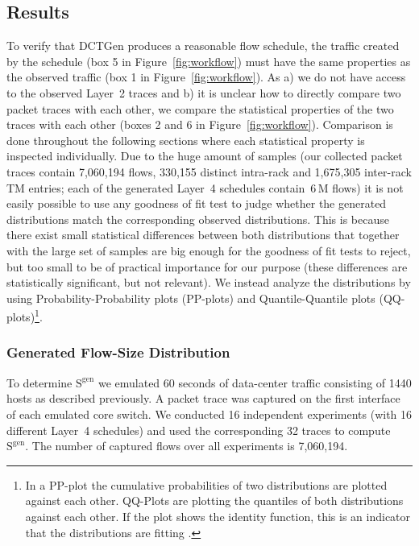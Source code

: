 \documentclass[journal,10pt]{IEEEtran}
\newcommand{\genname}{DCTGen}
\newcommand{\lt}{Layer~2}
\newcommand{\lf}{Layer~4}
\newcommand{\size}[1]{\ensuremath{\mathrm{S}  ^{\mathrm{#1}}}}
\begin{document}
	\subsection{Results}
		To verify that \genname{} produces a reasonable flow schedule, the traffic created by the schedule (box 5 in Figure~\ref{fig:workflow}) 
		must have the same properties as the observed traffic (box 1 in Figure~\ref{fig:workflow}).
		As a) we do not have access to the observed \lt{} traces and b) it is unclear how to directly compare two packet traces with each other,
		we compare the statistical properties of the two traces with each other (boxes 2 and 6 in Figure~\ref{fig:workflow}).
		Comparison is done throughout the following sections where each statistical property is inspected individually.
		Due to the huge amount of samples (our collected packet traces contain 7,060,194 flows, 330,155 distinct intra-rack and 1,675,305 inter-rack TM entries; 
		each of the generated \lf{} schedules contain \,6\,M flows)
		it is not easily possible to use any goodness of fit test to judge whether the generated distributions match
		the corresponding observed distributions.
		This is because there exist small statistical differences between both distributions that together with the large set of samples are big enough for the 
		goodness of fit tests to reject, but too small to be of practical importance for our purpose
		(these differences are statistically significant, but not relevant).
		We instead analyze the distributions by using 
		Probability-Probability plots (PP-plots) and Quantile-Quantile plots (QQ-plots)\footnote{In a PP-plot the cumulative probabilities of two distributions are plotted against each other. QQ-Plots are plotting the quantiles of both distributions against each other. If the plot shows the identity function,
		this is an indicator that the distributions are fitting \cite{GraphicalMethodsforDataAnalysis}.}.

		\subsubsection{Generated Flow-Size Distribution}
		\label{sec:GeneratedFlow-SizeDistribution}
			To determine \size{gen}
			we emulated 60 seconds of data-center traffic consisting of 1440 hosts as described previously.
			A packet trace was captured on the first interface of each emulated core switch.
			We conducted 16 independent experiments (with 16 different \lf{} schedules) and used the corresponding 32 traces to compute \size{gen}.
			The number of captured flows over all experiments is 7,060,194. 
\end{document}
